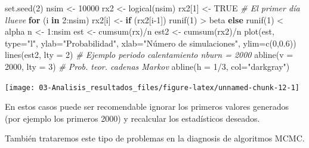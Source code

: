 \documentclass[
]{book}
\newenvironment{Shaded}{\begin{snugshade}}{\end{snugshade}}
\newcommand{\AttributeTok}[1]{\textcolor[rgb]{0.77,0.63,0.00}{#1}}
\newcommand{\CommentTok}[1]{\textcolor[rgb]{0.56,0.35,0.01}{\textit{#1}}}
\newcommand{\ConstantTok}[1]{\textcolor[rgb]{0.00,0.00,0.00}{#1}}
\newcommand{\ControlFlowTok}[1]{\textcolor[rgb]{0.13,0.29,0.53}{\textbf{#1}}}
\newcommand{\DecValTok}[1]{\textcolor[rgb]{0.00,0.00,0.81}{#1}}
\newcommand{\FloatTok}[1]{\textcolor[rgb]{0.00,0.00,0.81}{#1}}
\newcommand{\FunctionTok}[1]{\textcolor[rgb]{0.00,0.00,0.00}{#1}}
\newcommand{\NormalTok}[1]{#1}
\newcommand{\OtherTok}[1]{\textcolor[rgb]{0.56,0.35,0.01}{#1}}
\newcommand{\SpecialCharTok}[1]{\textcolor[rgb]{0.00,0.00,0.00}{#1}}
\newcommand{\StringTok}[1]{\textcolor[rgb]{0.31,0.60,0.02}{#1}}
\theoremstyle{break}
\theoremstyle{nonumberplain}
\begin{document}
\begin{Shaded}
\begin{Highlighting}[]
\FunctionTok{set.seed}\NormalTok{(}\DecValTok{2}\NormalTok{)}
\NormalTok{nsim }\OtherTok{\textless{}{-}} \DecValTok{10000}
\NormalTok{rx2 }\OtherTok{\textless{}{-}} \FunctionTok{logical}\NormalTok{(nsim)}
\NormalTok{rx2[}\DecValTok{1}\NormalTok{] }\OtherTok{\textless{}{-}} \ConstantTok{TRUE} \CommentTok{\# El primer día llueve}
\ControlFlowTok{for}\NormalTok{ (i }\ControlFlowTok{in} \DecValTok{2}\SpecialCharTok{:}\NormalTok{nsim)}
\NormalTok{  rx2[i] }\OtherTok{\textless{}{-}} \ControlFlowTok{if}\NormalTok{ (rx2[i}\DecValTok{{-}1}\NormalTok{]) }\FunctionTok{runif}\NormalTok{(}\DecValTok{1}\NormalTok{) }\SpecialCharTok{\textgreater{}}\NormalTok{ beta }\ControlFlowTok{else} \FunctionTok{runif}\NormalTok{(}\DecValTok{1}\NormalTok{) }\SpecialCharTok{\textless{}}\NormalTok{ alpha}
\NormalTok{n }\OtherTok{\textless{}{-}} \DecValTok{1}\SpecialCharTok{:}\NormalTok{nsim}
\NormalTok{est }\OtherTok{\textless{}{-}} \FunctionTok{cumsum}\NormalTok{(rx)}\SpecialCharTok{/}\NormalTok{n}
\NormalTok{est2 }\OtherTok{\textless{}{-}} \FunctionTok{cumsum}\NormalTok{(rx2)}\SpecialCharTok{/}\NormalTok{n}
\FunctionTok{plot}\NormalTok{(est, }\AttributeTok{type=}\StringTok{"l"}\NormalTok{, }\AttributeTok{ylab=}\StringTok{"Probabilidad"}\NormalTok{, }
     \AttributeTok{xlab=}\StringTok{"Número de simulaciones"}\NormalTok{, }\AttributeTok{ylim=}\FunctionTok{c}\NormalTok{(}\DecValTok{0}\NormalTok{,}\FloatTok{0.6}\NormalTok{))}
\FunctionTok{lines}\NormalTok{(est2, }\AttributeTok{lty =} \DecValTok{2}\NormalTok{)}
\CommentTok{\# Ejemplo periodo calentamiento nburn = 2000}
\FunctionTok{abline}\NormalTok{(}\AttributeTok{v =} \DecValTok{2000}\NormalTok{, }\AttributeTok{lty =} \DecValTok{3}\NormalTok{)}
\CommentTok{\# Prob. teor. cadenas Markov}
\FunctionTok{abline}\NormalTok{(}\AttributeTok{h =} \DecValTok{1}\SpecialCharTok{/}\DecValTok{3}\NormalTok{, }\AttributeTok{col=}\StringTok{"darkgray"}\NormalTok{)     }
\end{Highlighting}
\end{Shaded}

\begin{center}\texttt{[image: 03-Analisis\_resultados\_files/figure-latex/unnamed-chunk-12-1]} \end{center}

En estos casos puede ser recomendable ignorar los primeros valores generados (por ejemplo los primeros 2000) y recalcular los
estadísticos deseados.

También trataremos este tipo de problemas en la diagnosis de algoritmos MCMC.
\end{document}
